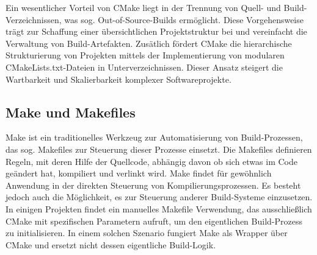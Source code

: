 Ein wesentlicher Vorteil von CMake liegt in der Trennung von Quell- und Build-Verzeichnissen, was sog. Out-of-Source-Builds ermöglicht.
Diese Vorgehensweise trägt zur Schaffung einer übersichtlichen Projektstruktur bei und vereinfacht die Verwaltung von Build-Artefakten.
Zusätlich fördert CMake die hierarchische Strukturierung von Projekten mittels der Implementierung von modularen CMakeLists.txt-Dateien in Unterverzeichnissen.
Dieser Ansatz steigert die Wartbarkeit und Skalierbarkeit komplexer Softwareprojekte.

\subsection{Make und Makefiles}
Make ist ein traditionelles Werkzeug zur Automatisierung von Build-Prozessen, das sog. Makefiles zur Steuerung dieser Prozesse einsetzt.
Die Makefiles definieren Regeln, mit deren Hilfe der Quellcode, abhängig davon ob sich etwas im Code geändert hat, kompiliert und verlinkt wird.
Make findet für gewöhnlich Anwendung in der direkten Steuerung von Kompilierungsprozessen.
 Es besteht jedoch auch die Möglichkeit, es zur Steuerung anderer Build-Systeme einzusetzen.
In einigen Projekten findet ein manuelles Makefile Verwendung, das ausschließlich CMake mit spezifischen Parametern aufruft, um den eigentlichen Build-Prozess zu initialisieren.
In einem solchen Szenario fungiert Make als Wrapper über CMake und ersetzt nicht dessen eigentliche Build-Logik.






























